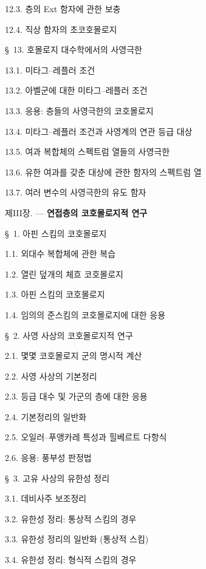 \begin{flushleft}
12.3. 층의 Ext 함자에 관한 보충 

12.4. 직상 함자의 초코호몰로지 


\S~13. 호몰로지 대수학에서의 사영극한 

13.1. 미타그--레플러 조건 

13.2. 아벨군에 대한 미타그--레플러 조건 

13.3. 응용: 층들의 사영극한의 코호몰로지 

13.4. 미타그--레플러 조건과 사영계의 연관 등급 대상 

13.5. 여과 복합체의 스펙트럼 열들의 사영극한 

13.6. 유한 여과를 갖춘 대상에 관한 함자의 스펙트럼 열 

13.7. 여러 변수의 사영극한의 유도 함자 

\medskip
\textsc{제III장.} --- \textbf{연접층의 코호몰로지적 연구} 

\medskip
\S~1. 아핀 스킴의 코호몰로지 

1.1. 외대수 복합체에 관한 복습 

1.2. 열린 덮개의 체흐 코호몰로지 

1.3. 아핀 스킴의 코호몰로지 

1.4. 임의의 준스킴의 코호몰로지에 대한 응용 

\medskip
\S~2. 사영 사상의 코호몰로지적 연구 

2.1. 몇몇 코호몰로지 군의 명시적 계산 

2.2. 사영 사상의 기본정리 

2.3. 등급 대수 및 가군의 층에 대한 응용 

2.4. 기본정리의 일반화 

2.5. 오일러--푸앵카레 특성과 힐베르트 다항식 

2.6. 응용: 풍부성 판정법 

\medskip
\S~3. 고유 사상의 유한성 정리 

3.1. 데비사주 보조정리 

3.2. 유한성 정리: 통상적 스킴의 경우 

3.3. 유한성 정리의 일반화 (통상적 스킴) 

3.4. 유한성 정리: 형식적 스킴의 경우 


\end{flushleft}
